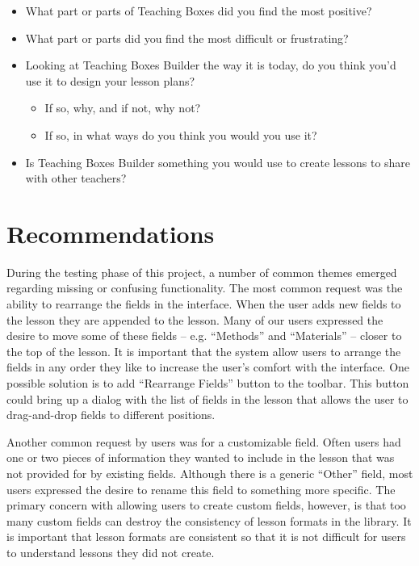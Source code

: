 \documentclass[10pt,letter]{article}
\begin{document}
\begin{itemize}
\item What part or parts of Teaching Boxes did you find the most positive?
\item What part or parts did you find the most difficult or frustrating?
\item Looking at Teaching Boxes Builder the way it is today, do you think you'd
      use it to design your lesson plans?
      \begin{itemize}
	  \item If so, why, and if not, why not?
	  \item If so, in what ways do you think you would you use it?
	  \end{itemize}
\item Is Teaching Boxes Builder something you would use to create lessons to
	  share with other teachers?
\end{itemize}

\section{Recommendations}
During the testing phase of this project, a number of common themes emerged
regarding missing or confusing functionality. The most common request was the
ability to rearrange the fields in the interface. When the user adds new fields
to the lesson they are appended to the lesson. Many of our users expressed the
desire to move some of these fields -- e.g. ``Methods'' and ``Materials'' --
closer to the top of the lesson. It is important that the system allow users to
arrange the fields in any order they like to increase the user's comfort with
the interface. One possible solution is to add ``Rearrange Fields'' button to
the toolbar. This button could bring up a dialog with the list of fields in the
lesson that allows the user to drag-and-drop fields to different positions.

Another common request by users was for a customizable field. Often users had
one or two pieces of information they wanted to include in the lesson that was
not provided for by existing fields. Although there is a generic ``Other''
field, most users expressed the desire to rename this field to something more
specific. The primary concern with allowing users to create custom fields,
however, is that too many custom fields can destroy the consistency of lesson
formats in the library. It is important that lesson formats are consistent so
that it is not difficult for users to understand lessons they did not create.
\end{document}
